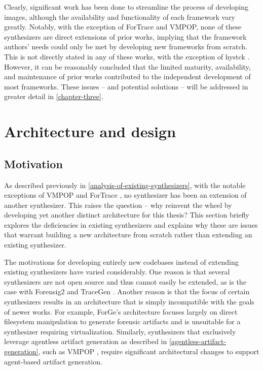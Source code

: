 \documentclass[letterpaper,12pt]{report}
\begin{document}
Clearly, significant work has been done to streamline the process of
developing images, although the availability and functionality of each
framework vary greatly. Notably, with the exception of ForTrace and
VMPOP, none of these synthesizers are direct extensions of prior works,
implying that the framework authors' needs could only be met by
developing new frameworks from scratch. This is not directly stated in
any of these works, with the exception of hystck
\cite{gobelNovelApproachGenerating2020}. However, it can be
reasonably concluded that the limited maturity, availability, and
maintenance of prior works contributed to the independent development of
most frameworks. These issues -- and potential solutions -- will be
addressed in greater detail in \autoref{chapter-three}.

\chapter{Architecture and design}\label{chapter-three}

\section{Motivation}\label{motivation}

As described previously in \autoref{analysis-of-existing-synthesizers}, with the notable exceptions of VMPOP
\cite{parkTREDEVMPOPCultivating2018} and ForTrace
\cite{gobelForTraceHolisticForensic2022}, no synthesizer has been an
extension of another synthesizer. This raises the question -- why
reinvent the wheel by developing yet another distinct architecture for
this thesis? This section briefly explores the deficiencies in existing
synthesizers and explains why these are issues that warrant building a
new architecture from scratch rather than extending an existing
synthesizer.

The motivations for developing entirely new codebases instead of
extending existing synthesizers have varied considerably. One reason is
that several synthesizers are not open source and thus cannot easily be
extended, as is the case with Forensig2
\cite{mochForensicImageGenerator2009} and TraceGen
\cite{duTraceGenUserActivity2021}. Another reason is that the focus
of certain synthesizers results in an architecture that is simply
incompatible with the goals of newer works. For example, ForGe's
architecture \cite{vistiAutomaticCreationComputer2015} focuses
largely on direct filesystem manipulation to generate forensic artifacts
and is unsuitable for a synthesizer requiring virtualization. Similarly,
synthesizers that exclusively leverage agentless artifact generation as
described in \autoref{agentless-artifact-generation}, such as VMPOP \cite{parkTREDEVMPOPCultivating2018},
require significant architectural changes to support agent-based
artifact generation.
\end{document}
